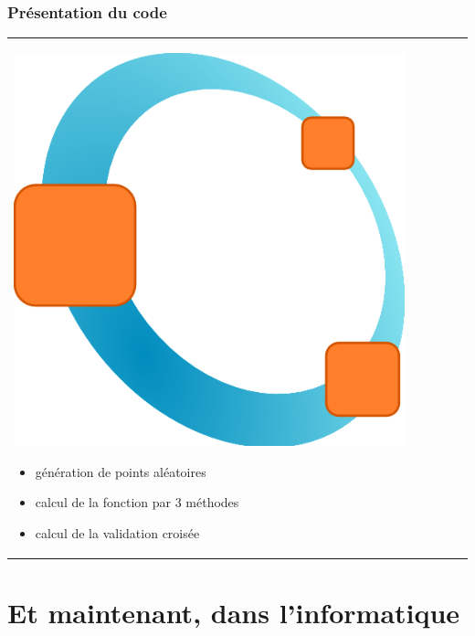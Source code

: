 \documentclass[handout]{beamer}
\begin{document}
	\begin{frame}
	\frametitle{Présentation du code}
	\begin{tabular}{l l}
		\begin{minipage}{0.4\textwidth}
			\begin{center}
				\includegraphics[width=0.9\textwidth]{images/octave.png}
			\end{center}
		\end{minipage}

		\begin{minipage}{0.6\textwidth}
			\begin{itemize}
				\item génération de points aléatoires 
				\item calcul de la fonction par 3 méthodes 
				\item calcul de la validation croisée
			\end{itemize}
		\end{minipage}

	\end{tabular}
	\end{frame}

	\section{Et maintenant, dans l'informatique}
\end{document}
